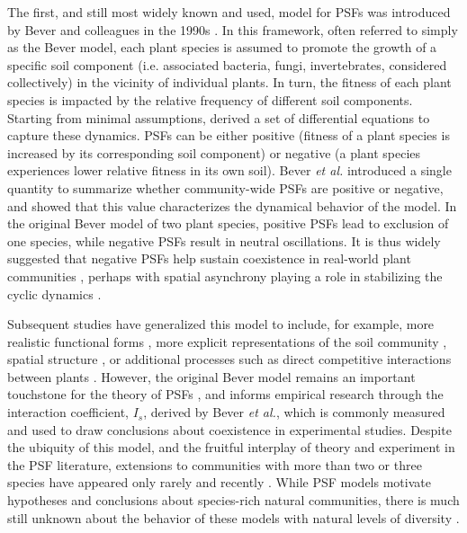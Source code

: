 \documentclass[11pt]{article}
\begin{document}
The first, and still most widely known and used, model for PSFs was introduced by Bever and colleagues in the 1990s \citep{bever1992ecological,bever1997incorporating,bever1999dynamics,bever2003soil}. In this framework, often referred to simply as the Bever model, each plant species is assumed to promote the growth of a specific soil component (i.e. associated bacteria, fungi, invertebrates, considered collectively) in the vicinity of individual plants. In turn, the fitness of each plant species is impacted by the relative frequency of different soil components. Starting from minimal assumptions, \citet{bever1997incorporating} derived a set of differential equations to capture these dynamics. PSFs can be either positive (fitness of a plant species is increased by its corresponding soil component) or negative (a plant species experiences lower relative fitness in its own soil). Bever \textit{et al.} introduced a single quantity to summarize whether community-wide PSFs are positive or negative, and showed that this value characterizes the dynamical behavior of the model. In the original Bever model of two plant species, positive PSFs lead to exclusion of one species, while negative PSFs result in neutral oscillations. It is thus widely suggested that negative PSFs help sustain coexistence in real-world plant communities \citep{kulmatiski2008plant,van2013plant}, perhaps with spatial asynchrony playing a role in stabilizing the cyclic dynamics \citep{revilla2013plant,bever2003soil}.

Subsequent studies have generalized this model to include, for example, more realistic functional forms \citep{umbanhowar2005simple, eppinga2006accumulation}, more explicit representations of the soil community \citep{bever2010rooting}, spatial structure \citep{eppinga2006accumulation,molofsky2002negative,suding2013consequences}, or additional processes such as direct competitive interactions between plants \citep{bever2003soil}. However, the original Bever model remains an important touchstone for the theory of PSFs \citep{ke2015incorporating,ke2020effects}, and informs empirical research through the interaction coefficient, $I_s$, derived by Bever \textit{et al.}, which is commonly measured and used to draw conclusions about coexistence in experimental studies. Despite the ubiquity of this model, and the fruitful interplay of theory and experiment in the PSF literature, extensions to communities with more than two or three species have appeared only rarely and recently \citep[but see][]{eppinga2018frequency,mack2019plant}. While PSF models motivate hypotheses and conclusions about species-rich natural communities, there is much still unknown about the behavior of these models with natural levels of diversity \citep{van2013plant}.
\end{document}
